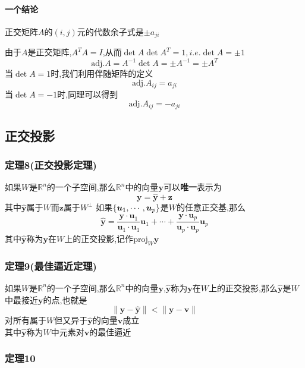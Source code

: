 \documentclass{article}
\newenvironment{cproof}{%
\heiti{证明}\kaishu
}{%
}
\newcommand{\RR}{\mathbb{R}}
\newcommand{\ve}{\boldsymbol}
\newcommand{\adj}{\text{adj.}}
\begin{document}
\begin{CJK}{UTF8}{gkai}
\paragraph{一个结论\\}
正交矩阵$A$的$(i,j)$元的代数余子式是$\pm a_{ji}$\\

\begin{cproof}

由于$A$是正交矩阵,$A^T A = I$,从而$\det A \det A^T = 1 ,i.e. \det A = \pm 1$\\
\[\adj A = A^{-1} \det A = \pm A^{-1} = \pm A^{T}\]
当$\det A = 1$时,我们利用伴随矩阵的定义\\
\[\adj A_{ij} = a_{ji}\]
当$\det A = -1$时,同理可以得到\\
\[\adj A_{ij} = -a_{ji}\]

\end{cproof}
\subsection{正交投影}

\subsubsection{定理8(正交投影定理)}
如果$W$是$\RR^n$的一个子空间,那么$\RR^n$中的向量$\ve{y}$可以\textbf{唯一}表示为
\[ \ve{y} = \hat{\ve{y}} + \ve{z}\]
其中$\hat{\ve{y}}$属于$W$而$\ve{z}$属于$W^{\bot}$
如果$\{\vs{u}{1}{p}\}$是$W$的任意正交基,那么
\[\hat{\ve{y}} = \dfrac{\ve{y} \cdot \ve{u}_1}{\ve{u}_1\cdot \ve{u}_1}\ve{u}_1 + \cdots + \dfrac{\ve{y} \cdot \ve{u}_p}{\ve{u}_p\cdot \ve{u}_p}\ve{u}_p\]
其中$\hat{\ve{y}}$称为$\ve{y}$在$W$上的正交投影,记作$\text{proj}_{W} \ve{y}$\\

\subsubsection{定理9(最佳逼近定理)}
如果$W$是$\RR^n$的一个子空间,那么$\RR^n$中的向量$\ve{y}$,$\hat{\ve{y}}$称为$\ve{y}$在$W$上的正交投影,那么$\hat{\ve{y}}$是$W$中最接近$\ve{y}$的点,也就是
\[\|\ve{y} - \hat{\ve{y}}\|<\|\ve{y} - \ve{v}\|\]
对所有属于$W$但又异于$\hat{\ve{y}}$的向量$\ve{v}$成立\\

其中$\hat{\ve{y}}$称为$W$中元素对$\ve{v}$的最佳逼近
\subsubsection{定理10}


\end{CJK}
\end{document}
